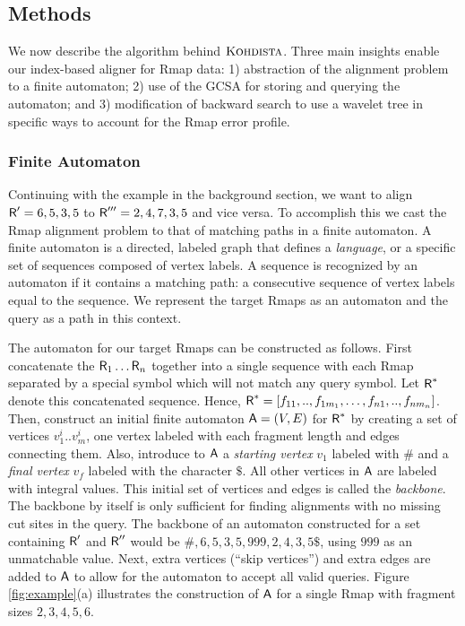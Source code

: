 \subsection{Methods}
\label{sec-methods-koh}

We now describe the algorithm behind $\mbox{\rm \textsc{Kohdista}}$.
Three main insights enable our index-based aligner for Rmap data: 1) abstraction of the alignment problem to a finite automaton; 2) use of the GCSA for storing and querying the automaton; and 3) modification of backward search to use a wavelet tree in specific ways to account for the Rmap error profile.

\subsubsection{Finite Automaton}

Continuing with the example in the background section, we want to align $\mbox{\rm {\sf R}}' = 6,5,3,5$ to $\mbox{\rm {\sf R}}''' = 2,4,7,3,5$ and vice versa.  To accomplish this we cast the Rmap alignment problem to that of matching paths in a finite automaton.  A finite automaton is  a directed, labeled graph that defines a \emph{language}, or a specific set of sequences composed of vertex labels.  A sequence is recognized by an automaton if it contains a matching path: a consecutive sequence of vertex labels equal to the sequence. We represent the target Rmaps as an automaton and the query as a path in this context.

The automaton for our target Rmaps can be constructed as follows.  First concatenate the $\mbox{\rm {\sf R}}_1 \ldots \mbox{\rm {\sf R}}_n$ together into a single sequence with each Rmap separated by  a special symbol which will not match any query symbol. Let $\mbox{\rm {\sf R}}^*$ denote this concatenated sequence. Hence, $\mbox{\rm {\sf R}}^* = [f_{11},..,f_{1m_1}, \ldots, f_{n1},..,f_{nm_n}]$.  Then, construct an initial finite automaton $\mathsf{A} = (V, E)$ for $\mbox{\rm {\sf R}}^*$ by creating a set of vertices $v^i_1 .. v^i_m$, one vertex labeled with each fragment length and edges connecting them. Also, introduce to $\mathsf{A}$  a {\em starting vertex} $v_1$ labeled with $\#$ and a {\em final vertex} $v_f$ labeled with the character $\$$.  All other vertices in $\mathsf{A}$ are labeled with integral values.  This initial set of vertices and edges is called the {\em backbone}.  The backbone by itself is only sufficient for finding alignments with no missing cut sites in the query.  The backbone of an automaton constructed for a set containing $\mbox{\rm {\sf R}}'$ and $\mbox{\rm {\sf R}}''$ would be  $\#, 6, 5, 3, 5, 999, 2, 4, 3, 5\$$, using $999$ as an unmatchable value.  Next, extra vertices (``skip vertices'') and extra edges are added to $\mathsf{A}$ to allow for the automaton to accept all valid queries.  Figure \ref{fig:example}(a) illustrates the construction of $\mathsf{A}$ for a single Rmap with fragment sizes $2, 3, 4, 5, 6$.

